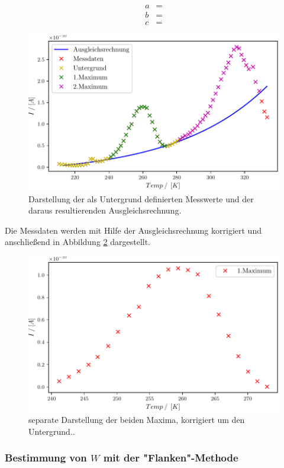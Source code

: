 \begin{align}
  a &=  \\
  b &=  \\
  c &= 
\end{align}

\begin{figure}
  \centering
  \includegraphics[width=.75\textwidth]{build/2_Temp_current_background_peak.pdf}
  \caption{Darstellung der als Untergrund definierten Messwerte und der daraus resultierenden Ausgleichsrechnung.}
  \label{fig:Auswertung_15}
\end{figure}

Die Messdaten werden mit Hilfe der Ausgleichsrechnung korrigiert und anschließend in Abbildung \ref{fig:Auswertung_16_17} dargestellt.

\begin{figure}[H]
  \centering
  \includegraphics[width=.75\textwidth]{build/2_Temp_current_peak.pdf}
  \caption{separate Darstellung der beiden Maxima, korrigiert um den Untergrund..}
  \label{fig:Auswertung_16_17}
\end{figure}

\subsubsection{Bestimmung von $W$ mit der "Flanken"-Methode}

